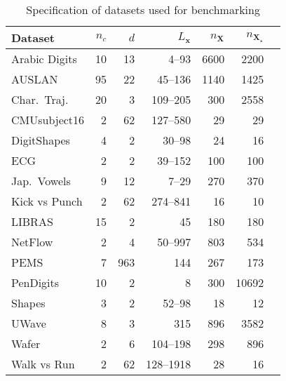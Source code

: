 \documentclass{article} \usepackage{iclr2021_conference,times}
\newcommand{\bx}{\mathbf{x}}
\newcommand{\bX}{\mathbf{X}}
\theoremstyle{plain}
\theoremstyle{definition}
\begin{document}
\begin{wraptable}{r}{8.5cm}
    \vspace{-20pt}
	\caption{Specification of datasets used for benchmarking}
	\label{table:dataset_spec}
	\vspace{-10pt}
\begin{center}
    \begin{small}
	\begin{sc}
    \begin{tabular}{lrrrrrr}
    \toprule
    Dataset  & $n_c$ & $d$ & $L_\bx$ & $n_\bX$ & $n_{\bX_\star}$ \\ \midrule
        Arabic Digits & 10 & 13 & \numrange[range-phrase = --]{4}{93} & 6600 & 2200\\
        AUSLAN & 95 & 22 & \numrange[range-phrase = --]{45}{136} & 1140 & 1425\\
        Char.~Traj.& 20 & 3 & \numrange[range-phrase = --]{109}{205} & 300 & 2558\\
        CMUsubject16 & 2 & 62 & \numrange[range-phrase = --]{127}{580} & 29 & 29\\
        DigitShapes & 4 & 2 & \numrange[range-phrase = --]{30}{98} & 24 & 16\\
        ECG & 2 & 2 & \numrange[range-phrase = --]{39}{152} & 100 & 100\\
        Jap.~Vowels & 9 & 12 & \numrange[range-phrase = --]{7}{29} & 270 & 370\\
        Kick vs Punch & 2 & 62 & \numrange[range-phrase = --]{274}{841} & 16 & 10\\
        LIBRAS & 15 & 2 & 45 & 180 & 180\\
        NetFlow & 2 & 4 & \numrange[range-phrase = --]{50}{997} & 803 & 534\\
        PEMS & 7 & 963 & 144 & 267 & 173\\
        PenDigits & 10 & 2 & 8 & 300 & 10692\\
        Shapes & 3 & 2 & \numrange[range-phrase = --]{52}{98} & 18 & 12\\
        UWave & 8 & 3 & 315 & 896 & 3582\\
        Wafer & 2 & 6 & \numrange[range-phrase = --]{104}{198} & 298 & 896\\
        Walk vs Run & 2 & 62 & \numrange[range-phrase = --]{128}{1918} & 28 & 16\\ \bottomrule
    \end{tabular}
	\end{sc}
    \end{small}
    \end{center}
\vspace{-15pt}
\end{wraptable}
\end{document}
